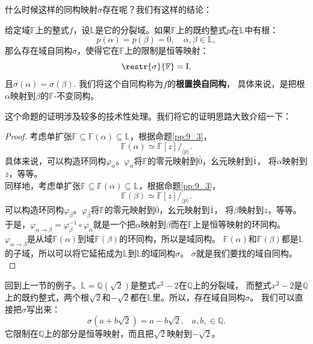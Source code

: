 \documentclass[12pt,UTF8]{ctexbook}
\begin{document}
什么时候这样的同构映射$\sigma$存在呢？我们有这样的结论：
\begin{pp}\label{pp:9_7}
    给定域$\mathbb{F}$上的整式$f$，设$\mathbb{L}$是它的分裂域。如果$\mathbb{F}$上的既约整式$p$在$\mathbb{L}$中有根：
    $$ p(\alpha) = p(\beta) = 0, \quad \alpha, \beta \in \mathbb{L}, $$
    那么存在域自同构$\sigma$，使得它在$\mathbb{F}$上的限制是恒等映射：
    $$ \restr{\sigma}{\mathbb{F}} = \mathrm{I}, $$
    且$\sigma(\alpha) = \sigma(\beta).$ 我们将这个自同构称为$f$的\textbf{根置换自同构}，
    具体来说，是把根$\alpha$映射到$\beta$的$\mathbb{F}$-不变同构。
\end{pp}
这个命题的证明涉及较多的技术性处理。我们将它的证明思路大致介绍一下：
\begin{proof} %
    考虑单扩张$\mathbb{F} \subseteq \mathbb{F}(\alpha) \subseteq \mathbb{L}$，根据命题\ref{pp:9_3}，
    $$ \mathbb{F}(\alpha) \simeq \mathbb{F}[z] /_{\langle p \rangle}.$$
    具体来说，可以构造环同构$\varphi_\alpha$。$\varphi_\alpha$将$\mathbb{F}$的零元映射到$\bar{0}$，幺元映射到$\bar{1}$，
    将$\alpha$映射到$\overline{z}$，等等。\\
    同样地，考虑单扩张$\mathbb{F} \subseteq \mathbb{F}(\alpha) \subseteq \mathbb{L}$，根据命题\ref{pp:9_3}，
    $$ \mathbb{F}(\beta) \simeq \mathbb{F}[z] /_{\langle p \rangle}.$$
    可以构造环同构$\varphi_\beta$。$\varphi_\beta$将$\mathbb{F}$的零元映射到$\bar{0}$，幺元映射到$\bar{1}$，
    将$\beta$映射到$\overline{z}$，等等。\\
    于是，$\varphi_{\alpha\rightarrow\beta} = \varphi_\beta^{-1}  \circ \varphi_\alpha$就是一个把$\alpha$映射到$\beta$而在$\mathbb{F}$上是恒等映射的环同构。
    $\varphi_{\alpha\rightarrow\beta}$是从域$\mathbb{F}(\alpha)$到域$\mathbb{F}(\beta)$的环同构，所以是域同构。
    $\mathbb{F}(\alpha)$和$\mathbb{F}(\beta)$都是$\mathbb{L}$的子域，所以可以将它延拓成为$\mathbb{L}$到$\mathbb{L}$的域同构$\sigma$。
    $\sigma$就是我们要找的域自同构。\\
\end{proof}

回到上一节的例子。$\mathbb{L} = \mathbb{Q}(\sqrt{2})$是整式$x^2 - 2$在$\mathbb{Q}$上的分裂域，
而整式$x^2 - 2$是$\mathbb{Q}$上的既约整式，两个根$\sqrt{2}$和$-\sqrt{2}$都在$\mathbb{L}$里。所以，存在域自同构$\sigma$。
我们可以直接把$\sigma$写出来：
$$\sigma (a + b\sqrt{2}) = a - b\sqrt{2}.\quad a, b, \in \mathbb{Q}.$$
它限制在$\mathbb{Q}$上的部分是恒等映射，而且把$\sqrt{2}$映射到$-\sqrt{2}$。
\end{document}
